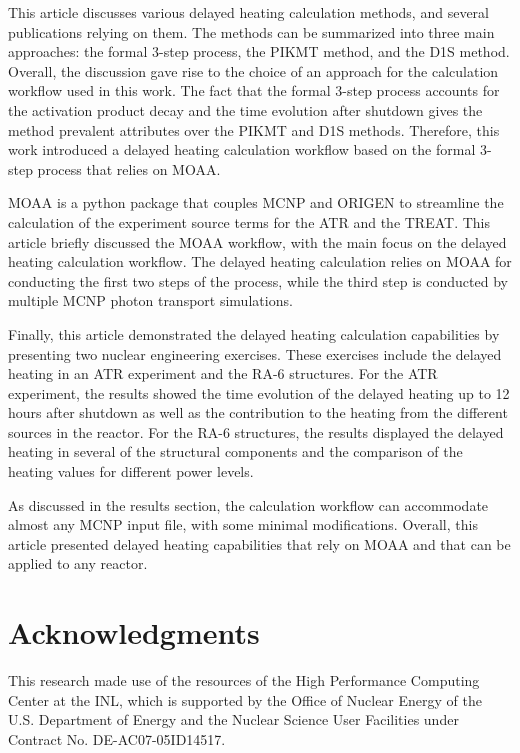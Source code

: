 \documentclass{style/nseJournal}
\begin{document}
This article discusses various delayed heating calculation methods, and several publications relying on them.
The methods can be summarized into three main approaches: the formal 3-step process, the PIKMT method, and the D1S method.
Overall, the discussion gave rise to the choice of an approach for the calculation workflow used in this work.
The fact that the formal 3-step process accounts for the activation product decay and the time evolution after shutdown gives the method prevalent attributes over the PIKMT and D1S methods.
Therefore, this work introduced a delayed heating calculation workflow based on the formal 3-step process that relies on MOAA.

MOAA is a python package that couples MCNP and ORIGEN to streamline the calculation of the experiment source terms for the \gls*{ATR} and the \gls*{TREAT}.
This article briefly discussed the MOAA workflow, with the main focus on the delayed heating calculation workflow.
The delayed heating calculation relies on MOAA for conducting the first two steps of the process, while the third step is conducted by multiple MCNP photon transport simulations.

Finally, this article demonstrated the delayed heating calculation capabilities by presenting two nuclear engineering exercises.
These exercises include the delayed heating in an ATR experiment and the RA-6 structures.
For the ATR experiment, the results showed the time evolution of the delayed heating up to 12 hours after shutdown as well as the contribution to the heating from the different sources in the reactor.
For the RA-6 structures, the results displayed the delayed heating in several of the structural components and the comparison of the heating values for different power levels.

As discussed in the results section, the calculation workflow can accommodate almost any MCNP input file, with some minimal modifications.
Overall, this article presented delayed heating capabilities that rely on MOAA and that can be applied to any reactor.


\pagebreak

\section*{Acknowledgments}

This research made use of the resources of the High Performance Computing Center at the \gls*{INL}, which is supported by the Office of Nuclear Energy of the U.S. Department of Energy and the Nuclear Science User Facilities under Contract No. DE-AC07-05ID14517.

\pagebreak


\end{document}
